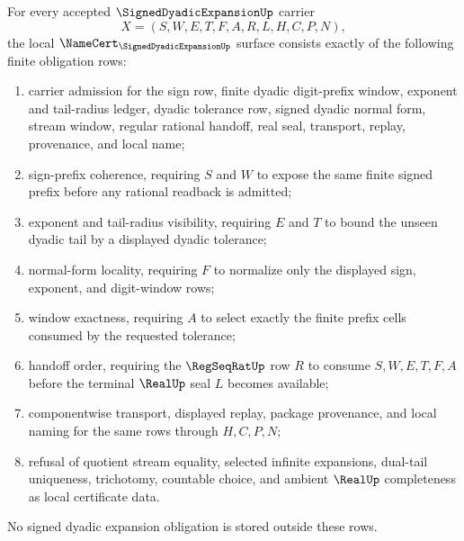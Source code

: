 \begin{theorem}
\label{thm:signed-dyadic-expansion-namecert-obligations}
For every accepted $\SignedDyadicExpansionUp$ carrier
$$
X=(S,W,E,T,F,A,R,L,H,C,P,N),
$$
the local $\NameCert_{\SignedDyadicExpansionUp}$ surface consists exactly of the following finite obligation rows:
\begin{enumerate}
\item carrier admission for the sign row, finite dyadic digit-prefix window, exponent and tail-radius ledger, dyadic tolerance row, signed dyadic normal form, stream window, regular rational handoff, real seal, transport, replay, provenance, and local name;
\item sign-prefix coherence, requiring $S$ and $W$ to expose the same finite signed prefix before any rational readback is admitted;
\item exponent and tail-radius visibility, requiring $E$ and $T$ to bound the unseen dyadic tail by a displayed dyadic tolerance;
\item normal-form locality, requiring $F$ to normalize only the displayed sign, exponent, and digit-window rows;
\item window exactness, requiring $A$ to select exactly the finite prefix cells consumed by the requested tolerance;
\item handoff order, requiring the $\RegSeqRatUp$ row $R$ to consume $S,W,E,T,F,A$ before the terminal $\RealUp$ seal $L$ becomes available;
\item componentwise transport, displayed replay, package provenance, and local naming for the same rows through $H,C,P,N$;
\item refusal of quotient stream equality, selected infinite expansions, dual-tail uniqueness, trichotomy, countable choice, and ambient $\RealUp$ completeness as local certificate data.
\end{enumerate}
No signed dyadic expansion obligation is stored outside these rows.
\end{theorem}
